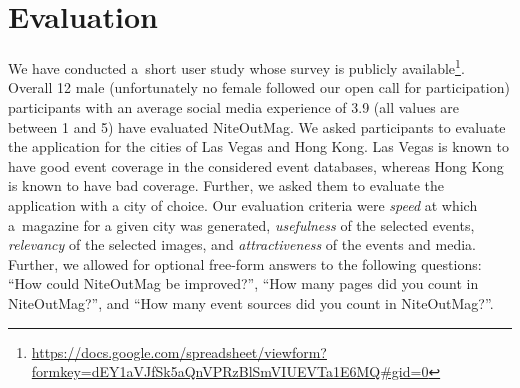 \documentclass[runningheads,a4paper]{llncs}
\begin{document}
{\section{Evaluation} \label{sec:evaluation}
We have conducted a~short user study whose survey is publicly
available\footnote{\url{https://docs.google.com/spreadsheet/viewform?formkey=dEY1aVJfSk5aQnVPRzBlSmVIUEVTa1E6MQ\#gid=0}}.
Overall 12 male (unfortunately no female followed our open call for participation) participants with an average social media experience of 3.9
(all values are between 1 and 5) have evaluated NiteOutMag.
We asked participants to evaluate the application for the cities of Las Vegas and Hong Kong.
Las Vegas is known to have good event coverage in the considered event databases,
whereas Hong Kong is known to have bad coverage.
Further, we asked them to evaluate the application with a city of choice.
Our evaluation criteria were
\emph{speed} at which a~magazine for a given city was generated,
\emph{usefulness} of the selected events,
\emph{relevancy} of the selected images, and
\emph{attractiveness} of the events and media.
Further, we allowed for optional free-form answers to the following questions:
``How could NiteOutMag be improved?'', ``How many pages did you count in NiteOutMag?'', and
``How many event sources did you count in NiteOutMag?''.

}
\end{document}
